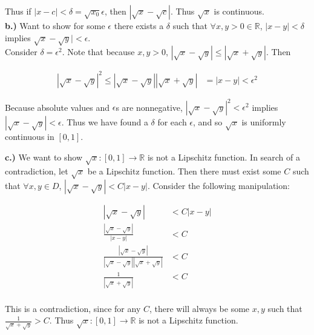 \documentclass[10pt]{article} %
\begin{document}
Thus if $|x-c|<\delta=\sqrt{x_0}\epsilon$, then $|\sqrt{x}-\sqrt{c}|$. Thus $\sqrt{x}$ is continuous.\\

\textbf{b.)} Want to show for some $\epsilon$ there exists a $\delta$ such that $\forall x,y >0 \in \mathbb{R}$, $|x-y|<\delta$ implies $\sqrt{x}-\sqrt{y}|<\epsilon$.\\

Consider $\delta = \epsilon^2$. Note that because $x,y>0$, $|\sqrt{x}-\sqrt{y}|\leq|\sqrt{x}+\sqrt{y}|$. Then

\begin{align*}
  |\sqrt{x}-\sqrt{y}|^2 \leq |\sqrt{x}-\sqrt{y}||\sqrt{x}+\sqrt{y}| &= |x-y| < \epsilon^2
\end{align*}

Because absolute values and $\epsilon$s are nonnegative, $|\sqrt{x}-\sqrt{y}|^2 < \epsilon^2$ implies $|\sqrt{x}-\sqrt{y}|<\epsilon$. Thus we have found a $\delta$ for each $\epsilon$, and so $\sqrt{x}$ is uniformly continuous in $[0,1]$.

\textbf{c.)} We want to show $\sqrt{x}:[0,1]\rightarrow\mathbb{R}$ is not a Lipschitz function. In search of a contradiction, let $\sqrt{x}$ be a Lipschitz function. Then there must exist some $C$ such that $\forall x,y \in D$, $|\sqrt{x}-\sqrt{y}|<C|x-y|$. Consider the following manipulation:

\begin{align*}
  |\sqrt{x}-\sqrt{y}|&<C|x-y|\\
  \frac{|\sqrt{x}-\sqrt{y}|}{|x-y|}&<C\\
  \frac{|\sqrt{x}-\sqrt{y}|}{|\sqrt{x}-\sqrt{y}||\sqrt{x}+\sqrt{y}|}&<C\\
  \frac{1}{|\sqrt{x}+\sqrt{y}|}&<C\\
\end{align*}

This is a contradiction, since for any $C$, there will always be some $x,y$ such that  $\frac{1}{\sqrt{x}+\sqrt{y}} > C$. Thus $\sqrt{x}:[0,1]\rightarrow\mathbb{R}$ is not a Lipschitz function.\\
\end{document}
